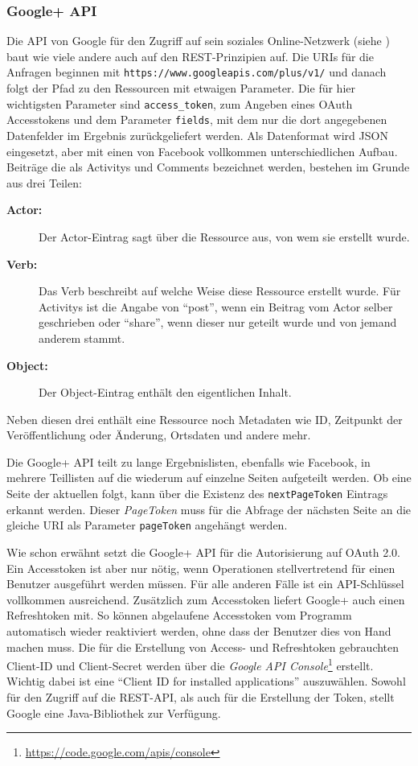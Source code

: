 \subsubsection{Google+ API} %
\label{ssub:google_api}

Die API von Google für den Zugriff auf sein soziales Online-Netzwerk (siehe \cite{GooglePlusApi}) baut wie viele andere auch auf den REST-Prinzipien auf. Die URIs für die Anfragen beginnen mit \texttt{https://www.googleapis.com/plus/v1/} und danach folgt der Pfad zu den Ressourcen mit etwaigen Parameter. Die für hier wichtigsten Parameter sind \texttt{access\_token}, zum Angeben eines OAuth Accesstokens und dem Parameter \texttt{fields}, mit dem nur die dort angegebenen Datenfelder im Ergebnis zurückgeliefert werden. Als Datenformat wird JSON eingesetzt, aber mit einen von Facebook vollkommen unterschiedlichen Aufbau. Beiträge die als Activitys und Comments bezeichnet werden, bestehen im Grunde aus drei Teilen:

\begin{description}
    \item[\textbf{Actor:}] Der Actor-Eintrag sagt über die Ressource aus, von wem sie erstellt wurde. 
    \item[\textbf{Verb:}] Das Verb beschreibt auf welche Weise diese Ressource erstellt wurde. Für Activitys ist die Angabe von \enquote{post}, wenn ein Beitrag vom Actor selber geschrieben oder \enquote{share}, wenn dieser nur geteilt wurde und von jemand anderem stammt. 
    \item[\textbf{Object:}] Der Object-Eintrag enthält den eigentlichen Inhalt.
\end{description}

Neben diesen drei enthält eine Ressource noch Metadaten wie ID, Zeitpunkt der Veröffentlichung oder Änderung, Ortsdaten und andere mehr.

Die Google+ API teilt zu lange Ergebnislisten, ebenfalls wie Facebook, in mehrere Teillisten auf die wiederum auf einzelne Seiten aufgeteilt werden. Ob eine Seite der aktuellen folgt, kann über die Existenz des \texttt{nextPageToken} Eintrags erkannt werden. Dieser \emph{PageToken} muss für die Abfrage der nächsten Seite an die gleiche URI als Parameter \texttt{pageToken} angehängt werden. 

Wie schon erwähnt setzt die Google+ API für die Autorisierung auf OAuth 2.0. Ein Accesstoken ist aber nur nötig, wenn Operationen stellvertretend für einen Benutzer ausgeführt werden müssen. Für alle anderen Fälle ist ein API-Schlüssel vollkommen ausreichend. Zusätzlich zum Accesstoken liefert Google+ auch einen Refreshtoken mit. So können abgelaufene Accesstoken vom Programm automatisch wieder reaktiviert werden, ohne dass der Benutzer dies von Hand machen muss. Die für die Erstellung von Access- und Refreshtoken gebrauchten Client-ID und Client-Secret werden über die \emph{Google API Console}\footnote{\url{https://code.google.com/apis/console}} erstellt. Wichtig dabei ist eine \enquote{Client ID for installed applications} auszuwählen. Sowohl für den Zugriff auf die REST-API, als auch für die Erstellung der Token, stellt Google eine Java-Bibliothek zur Verfügung. 

